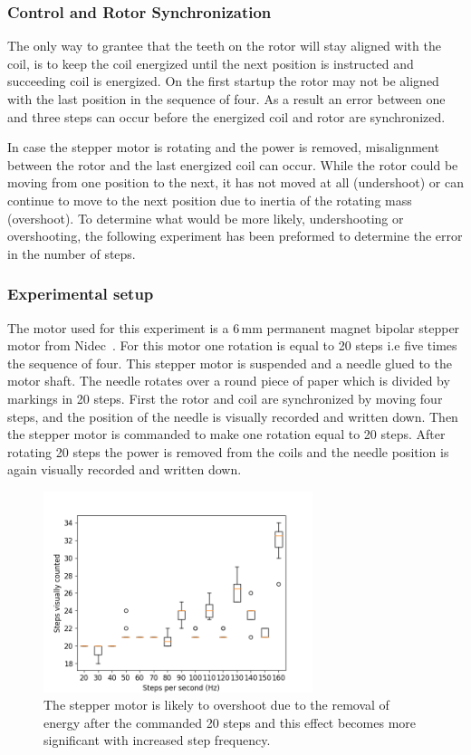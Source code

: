 \subsubsection{Control and Rotor Synchronization}

The only way to grantee that the teeth on the rotor will stay aligned with the coil, is to keep the coil energized until the next position is instructed and succeeding coil is energized. 
On the first startup the rotor may not be aligned with the last position in the sequence of four.
As a result an error between one and three steps can occur before the energized coil and rotor are synchronized.

In case the stepper motor is rotating and the power is removed, misalignment between the rotor and the last energized coil can occur.
While the rotor could be moving from one position to the next, it has not moved at all (undershoot) or can continue to move to the next position due to inertia of the rotating mass (overshoot). 
To determine what would be more likely, undershooting or overshooting, the following experiment has been preformed to determine the error in the number of steps.

\subsubsection{Experimental setup}

The motor used for this experiment is a 6\,mm permanent magnet bipolar stepper motor from Nidec~\cite{nidec_stepper_2017}.
For this motor one rotation is equal to 20 steps i.e five times the sequence of four.
This stepper motor is suspended and a needle glued to the motor shaft.
The needle rotates over a round piece of paper which is divided by markings in 20 steps.%
First the rotor and coil are synchronized by moving four steps, and the position of the needle is visually recorded and written down.  
Then the stepper motor is commanded to make one rotation equal to 20 steps.
After rotating 20 steps the power is removed from the coils and the needle position is again visually recorded and written down.

\begin{figure}
	\centering
	\includegraphics[width=0.7\textwidth]{pics/figure_intertia.png}
	\caption{The stepper motor is likely to overshoot due to the removal of energy after the commanded 20 steps and this effect becomes more significant with increased step frequency.}
	\label{fig:step_results}
\end{figure}


